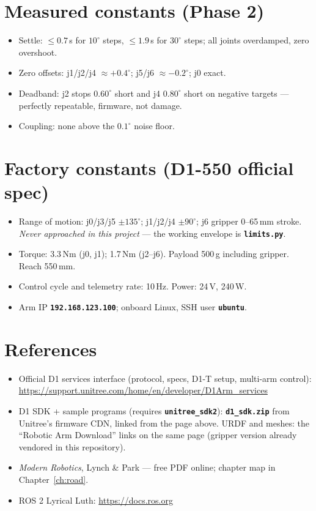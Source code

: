 \documentclass[11pt,twoside,openright]{book}
\newcommand{\code}[1]{\texttt{\bfseries #1}}
\begin{document}
\section{Measured constants (Phase 2)}

\begin{itemize}
  \item Settle: $\le 0.7$\,s for $10^\circ$ steps, $\le 1.9$\,s for
    $30^\circ$ steps; all joints overdamped, zero overshoot.
  \item Zero offsets: j1/j2/j4 $\approx +0.4^\circ$; j5/j6
    $\approx -0.2^\circ$; j0 exact.
  \item Deadband: j2 stops $0.60^\circ$ short and j4 $0.80^\circ$ short
    on negative targets --- perfectly repeatable, firmware, not damage.
  \item Coupling: none above the $0.1^\circ$ noise floor.
\end{itemize}

\section{Factory constants (D1-550 official spec)}

\begin{itemize}
  \item Range of motion: j0/j3/j5 $\pm135^\circ$; j1/j2/j4
    $\pm90^\circ$; j6 gripper 0--65\,mm stroke. \emph{Never approached
    in this project} --- the working envelope is \code{limits.py}.
  \item Torque: 3.3\,Nm (j0, j1); 1.7\,Nm (j2--j6). Payload 500\,g
    including gripper. Reach 550\,mm.
  \item Control cycle and telemetry rate: 10\,Hz. Power: 24\,V, 240\,W.
  \item Arm IP \code{192.168.123.100}; onboard Linux, SSH user
    \code{ubuntu}.
\end{itemize}

\section{References}

\begin{itemize}
  \item Official D1 services interface (protocol, specs, D1-T setup,
    multi-arm control):\\
    \url{https://support.unitree.com/home/en/developer/D1Arm_services}
  \item D1 SDK + sample programs (requires \code{unitree\_sdk2}):
    \code{d1\_sdk.zip} from Unitree's firmware CDN, linked from the page
    above. URDF and meshes: the ``Robotic Arm Download'' links on the
    same page (gripper version already vendored in this repository).
  \item \textit{Modern Robotics}, Lynch \& Park --- free PDF online;
    chapter map in Chapter~\ref{ch:road}.
  \item ROS 2 Lyrical Luth: \url{https://docs.ros.org}
\end{itemize}
\end{document}
